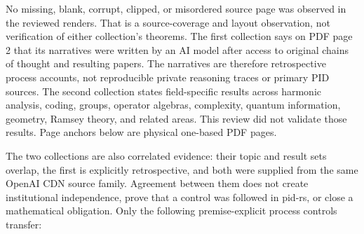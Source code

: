 \documentclass[11pt]{article}
\begin{document}
\begin{markdown}
No missing, blank, corrupt, clipped, or misordered source page was observed in the reviewed
renders. That is a source-coverage and layout observation, not verification of either collection's
theorems. The first collection says on PDF page 2 that its narratives were written by an AI model
after access to original chains of thought and resulting papers. The narratives are therefore
retrospective process accounts, not reproducible private reasoning traces or primary PID sources.
The second collection states field-specific results across harmonic analysis, coding, groups,
operator algebras, complexity, quantum information, geometry, Ramsey theory, and related areas.
This review did not validate those results. Page anchors below are physical one-based PDF pages.

The two collections are also correlated evidence: their topic and result sets overlap, the first is
explicitly retrospective, and both were supplied from the same OpenAI CDN source family. Agreement between them
does not create institutional independence, prove that a control was followed in pid-rs, or close a
mathematical obligation. Only the following premise-explicit process controls transfer:


\end{markdown}
\end{document}
